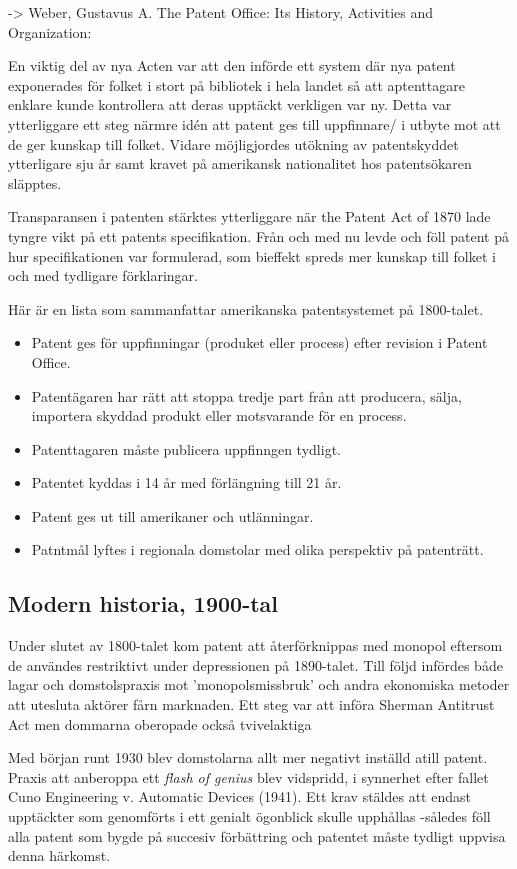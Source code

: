 -> Weber, Gustavus A. The Patent Office: Its History, Activities and Organization:

En viktig del av nya Acten var att den införde ett system där nya patent exponerades för folket i stort
på bibliotek i hela landet så att aptenttagare enklare kunde kontrollera att deras upptäckt verkligen
var ny\cite{watson}. Detta var ytterliggare ett steg närmre idén att patent ges till uppfinnare/ i
utbyte mot att de ger kunskap till folket. Vidare möjligjordes utökning av patentskyddet ytterligare sju
år \cite{watson} samt kravet på amerikansk nationalitet hos patentsökaren släpptes.

Transparansen i patenten stärktes ytterliggare när the Patent Act of 1870 lade tyngre vikt på ett
patents specifikation. Från och med nu levde och föll patent på hur specifikationen var formulerad, som
bieffekt spreds mer kunskap till folket i och med tydligare förklaringar\cite{nard}.

Här är en lista som sammanfattar amerikanska patentsystemet på 1800-talet.
\begin{itemize}
	\item Patent ges för uppfinningar (produket eller process) efter revision i Patent Office.
	\item Patentägaren har rätt att stoppa tredje part från att producera, sälja, importera skyddad produkt eller motsvarande för en process.
	\item Patenttagaren måste publicera uppfinngen tydligt.
	\item Patentet kyddas i 14 år med förlängning till 21 år.
	\item Patent ges ut till amerikaner och utlänningar.
	\item Patntmål lyftes i regionala domstolar med olika perspektiv på patenträtt.
\end{itemize}


\subsection{Modern historia, 1900-tal} 

Under slutet av 1800-talet kom patent att återförknippas med monopol eftersom de användes
restriktivt under depressionen  på 1890-talet. Till följd infördes både lagar och domstolspraxis mot 'monopolsmissbruk' och andra ekonomiska metoder att utesluta aktörer fårn marknaden. Ett steg var att införa Sherman Antitrust Act men dommarna oberopade också tvivelaktiga

Med början runt 1930 blev domstolarna allt mer negativt inställd atill
patent. Praxis att anberoppa ett \emph{flash of genius} blev vidspridd, i synnerhet efter fallet Cuno
Engineering v. Automatic Devices (1941). Ett krav stäldes att endast upptäckter som genomförts i ett
genialt ögonblick skulle upphållas -således föll alla patent som bygde på succesiv förbättring och
patentet måste tydligt uppvisa denna härkomst\cite{nard}. 

